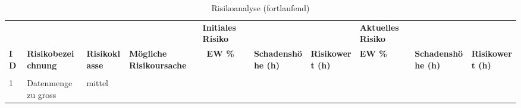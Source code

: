\thispagestyle{lscape}
\pagestyle{lscape}
\begin{landscape}
\begin{table}[H]
\scriptsize
\caption{Risikoanalyse (fortlaufend)}
\begin{tabular}{p{0.5cm}p{4cm} p{1.5cm} p{1.5cm} p{1cm} p{2cm}p{1.5cm}p{1cm}p{2cm}p{1.5cm}}
\hline & & & & \bf Initiales Risiko \cellcolor{lightgray} & \cellcolor{lightgray} & \cellcolor{lightgray} & \bf Aktuelles Risiko & & \\ [13pt]
\bf \bf ID & \bf Risikobezeichnung & \bf Risikoklasse & \bf Mögliche Risikoursache & \ \bf EW \% \cellcolor{lightgray} & \bf Schadenshöhe (h) \cellcolor{lightgray} & \bf Risikowert (h) \cellcolor{lightgray} & \bf EW \% & \bf Schadenshöhe (h) & \bf Risikowert (h) \\
\hline
&&&&&&&&&\\
1 & Datenmenge zu gross & mittel \cellcolor{yellow!50} &&&&&&&\\


\hline
\end{tabular}
\end{table}
\end{landscape}

\restoregeometry
\pagestyle{headings}

